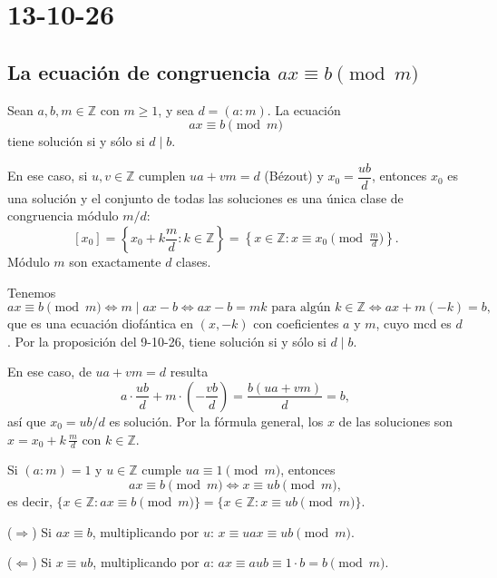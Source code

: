 \chapter{13-10-26}

\section{La ecuación de congruencia $ax\equiv b \pmod m$}

\begin{proposicion}
Sean $a,b,m\in\mathbb{Z}$ con $m\ge 1$, y sea $d=(a:m)$. La ecuación
\[
ax\equiv b \pmod m
\]
tiene solución si y sólo si $d\mid b$.

En ese caso, si $u,v\in\mathbb{Z}$ cumplen $ua+vm=d$ (Bézout) y
$x_0=\dfrac{ub}{d}$, entonces $x_0$ es una solución y el conjunto de todas las
soluciones es una única clase de congruencia módulo $m/d$:
\[
[x_0]=\left\{x_0+k\frac{m}{d} : k\in\mathbb{Z}\right\}
=\left\{x\in\mathbb{Z} : x\equiv x_0 \pmod{\tfrac{m}{d}}\right\}.
\]
Módulo $m$ son exactamente $d$ clases.
\end{proposicion}

\begin{demostracion}
Tenemos
\[
ax\equiv b \pmod m \iff m\mid ax-b \iff ax-b=mk \text{ para algún }k\in\mathbb{Z}
\iff ax+m(-k)=b,
\]
que es una ecuación diofántica en $(x,-k)$ con coeficientes $a$ y $m$, cuyo
mcd es $d$. Por la proposición del 9-10-26, tiene solución si y sólo si $d\mid b$.

En ese caso, de $ua+vm=d$ resulta
\[
a\cdot\frac{ub}{d}+m\cdot\left(-\frac{vb}{d}\right)=\frac{b(ua+vm)}{d}=b,
\]
así que $x_0=ub/d$ es solución. Por la fórmula general, los $x$ de las soluciones
son $x=x_0+k\,\tfrac{m}{d}$ con $k\in\mathbb{Z}$.
\end{demostracion}

\begin{proposicion}
Si $(a:m)=1$ y $u\in\mathbb{Z}$ cumple $ua\equiv 1 \pmod m$, entonces
\[
ax\equiv b \pmod m \iff x\equiv ub \pmod m,
\]
es decir, $\{x\in\mathbb{Z} : ax\equiv b \pmod m\}=\{x\in\mathbb{Z} : x\equiv ub \pmod m\}$.
\end{proposicion}

\begin{demostracion}
($\Rightarrow$) Si $ax\equiv b$, multiplicando por $u$:
$x\equiv uax\equiv ub \pmod m$.

($\Leftarrow$) Si $x\equiv ub$, multiplicando por $a$: $ax\equiv aub\equiv 1\cdot b=b \pmod m$.
\end{demostracion}


